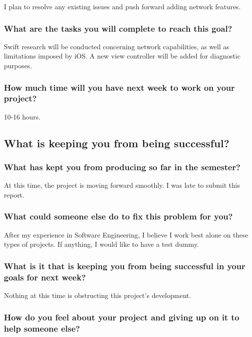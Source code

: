 \documentclass[letterpaper]{article}            %
\begin{document}
I plan to resolve any existing issues and push forward adding network features.

\subsubsection{What are the tasks you will complete to reach this goal?}

Swift research will be conducted concerning network capabilities, as well as limitations imposed by iOS. A new view controller will be added for diagnostic purposes.

\subsubsection{How much time will you have next week to work on your project?}

10-16 hours.


\subsection{What is keeping you from being successful?}

\subsubsection{What has kept you from producing so far in the semester?}

At this time, the project is moving forward smoothly. I was late to submit this report.

\subsubsection{What could someone else do to fix this problem for you?}

After my experience in Software Engineering, I believe I work best alone on these types of projects. If anything, I would like to have a test dummy.

\subsubsection{What is it that is keeping you from being successful in your goals for next week?}

Nothing at this time is obstructing this project's development.

\subsubsection{How do you feel about your project and giving up on it to help someone else?}
\end{document}
